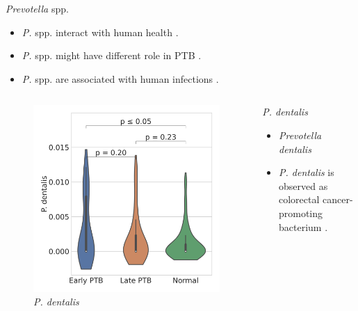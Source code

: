 \documentclass{beamer}
\begin{document}
\begin{frame}[allowframebreaks]
        \begin{block}{\textit{Prevotella} spp.}
            \begin{itemize}
                \item \textit{P.} spp. interact with human health \cite{Prevotella-1}.
                \item \textit{P.} spp. might have different role in PTB \cite{Prevotella-2}.
                \item \textit{P.} spp. are associated with human infections \cite{Prevotella-4}.
            \end{itemize}
        \end{block}
        \pagebreak

        \begin{columns}
            \begin{column}{0.4 \linewidth}
                \begin{figure}
                    \includegraphics[width=\linewidth]{figures/Step71_Proportion/everything.DADA2.homd.Mouth/P. dentalis.pdf}
                    \caption{\textit{P. dentalis}}
                \end{figure}
            \end{column}
            \begin{column}{0.6 \linewidth}
                \begin{block}{\textit{P. dentalis}}
                    \begin{itemize}
                        \item \textit{Prevotella dentalis}
                        \item \textit{P. dentalis} is observed as colorectal cancer-promoting bacterium \cite{Prevotella-3}.
                    \end{itemize}
                \end{block}
            \end{column}
        \end{columns}


\end{frame}
\end{document}
